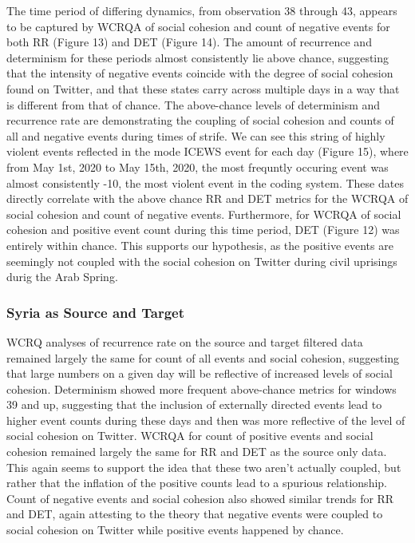 \documentclass[english,man]{apa6}
\begin{document}
The time period of differing dynamics, from observation 38 through 43, appears to be captured by WCRQA of social cohesion and count of negative events for both RR (Figure 13) and DET (Figure 14). The amount of recurrence and determinism for these periods almost consistently lie above chance, suggesting that the intensity of negative events coincide with the degree of social cohesion found on Twitter, and that these states carry across multiple days in a way that is different from that of chance.
The above-chance levels of determinism and recurrence rate are demonstrating the coupling of social cohesion and counts of all and negative events during times of strife. We can see this string of highly violent events reflected in the mode ICEWS event for each day (Figure 15), where from May 1st, 2020 to May 15th, 2020, the most frequntly occuring event was almost consistently -10, the most violent event in the coding system. These dates directly correlate with the above chance RR and DET metrics for the WCRQA of social cohesion and count of negative events. Furthermore, for WCRQA of social cohesion and positive event count during this time period, DET (Figure 12) was entirely within chance. This supports our hypothesis, as the positive events are seemingly not coupled with the social cohesion on Twitter during civil uprisings durig the Arab Spring.

\hypertarget{syria-as-source-and-target-3}{%
\subsubsection{Syria as Source and Target}\label{syria-as-source-and-target-3}}

WCRQ analyses of recurrence rate on the source and target filtered data remained largely the same for count of all events and social cohesion, suggesting that large numbers on a given day will be reflective of increased levels of social cohesion. Determinism showed more frequent above-chance metrics for windows 39 and up, suggesting that the inclusion of externally directed events lead to higher event counts during these days and then was more reflective of the level of social cohesion on Twitter. WCRQA for count of positive events and social cohesion remained largely the same for RR and DET as the source only data. This again seems to support the idea that these two aren't actually coupled, but rather that the inflation of the positive counts lead to a spurious relationship. Count of negative events and social cohesion also showed similar trends for RR and DET, again attesting to the theory that negative events were coupled to social cohesion on Twitter while positive events happened by chance.
\end{document}
